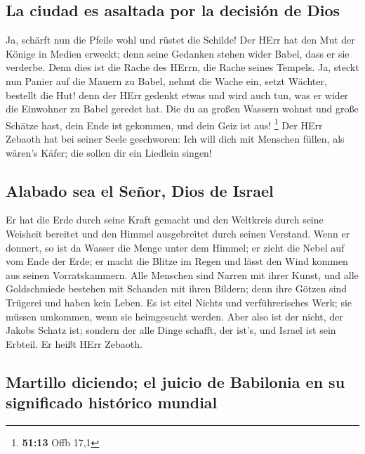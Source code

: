 \hypertarget{la-ciudad-es-asaltada-por-la-decisiuxf3n-de-dios}{%
\subsection{La ciudad es asaltada por la decisión de
Dios}\label{la-ciudad-es-asaltada-por-la-decisiuxf3n-de-dios}}

 Ja, schärft nun die Pfeile wohl und rüstet die Schilde!
Der HErr hat den Mut der Könige in Medien erweckt; denn seine Gedanken
stehen wider Babel, dass er sie verderbe. Denn dies ist die Rache des
HErrn, die Rache seines Tempels.  Ja, steckt nun Panier
auf die Mauern zu Babel, nehmt die Wache ein, setzt Wächter, bestellt
die Hut! denn der HErr gedenkt etwas und wird auch tun, was er wider die
Einwohner zu Babel geredet hat.  Die du an großen Wassern
wohnst und große Schätze hast, dein Ende ist gekommen, und dein Geiz ist
aus! \footnote{\textbf{51:13} Offb 17,1}  Der HErr
Zebaoth hat bei seiner Seele geschworen: Ich will dich mit Menschen
füllen, als wären's Käfer; die sollen dir ein Liedlein singen!

\hypertarget{alabado-sea-el-seuxf1or-dios-de-israel}{%
\subsection{Alabado sea el Señor, Dios de
Israel}\label{alabado-sea-el-seuxf1or-dios-de-israel}}

 Er hat die Erde durch seine Kraft gemacht und den
Weltkreis durch seine Weisheit bereitet und den Himmel ausgebreitet
durch seinen Verstand.  Wenn er donnert, so ist da Wasser
die Menge unter dem Himmel; er zieht die Nebel auf vom Ende der Erde; er
macht die Blitze im Regen und lässt den Wind kommen aus seinen
Vorratskammern.  Alle Menschen sind Narren mit ihrer
Kunst, und alle Goldschmiede bestehen mit Schanden mit ihren Bildern;
denn ihre Götzen sind Trügerei und haben kein Leben.  Es
ist eitel Nichts und verführerisches Werk; sie müssen umkommen, wenn sie
heimgesucht werden.  Aber also ist der nicht, der Jakobs
Schatz ist; sondern der alle Dinge schafft, der ist's, und Israel ist
sein Erbteil. Er heißt HErr Zebaoth.

\hypertarget{martillo-diciendo-el-juicio-de-babilonia-en-su-significado-histuxf3rico-mundial}{%
\subsection{Martillo diciendo; el juicio de Babilonia en su significado
histórico
mundial}\label{martillo-diciendo-el-juicio-de-babilonia-en-su-significado-histuxf3rico-mundial}}

